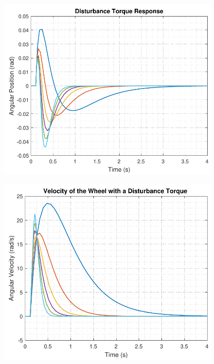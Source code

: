 \begin{minipage}{\linewidth}
	\begin{minipage}{0.45\linewidth}
		\begin{figure}[H]
			\includegraphics[scale=.55]{figures/disturbanceStateSpace}
			\centering
			\captionsetup{justification=centering}
			\label{disturbanceStateSpace}
		\end{figure}
	\end{minipage}
	\hspace{0.03\linewidth}
	\begin{minipage}{0.45\linewidth}
		\begin{figure}[H]\vspace{0mm}
			\includegraphics[scale=.55]{figures/disturbanceStateSpaceWheel}
			\centering
			\captionsetup{justification=centering}
			\label{disturbanceStateSpaceWheel}
		\end{figure}
	\end{minipage}
\end{minipage}
